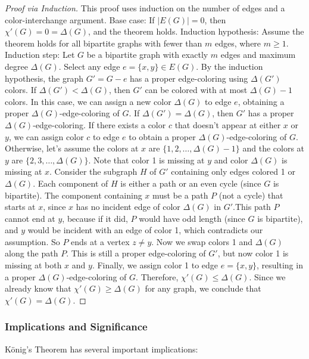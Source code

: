 \documentclass{article}
\theoremstyle{definition}
\begin{document}
\begin{proof}[Proof via Induction]
This proof uses induction on the number of edges and a color-interchange argument. Base case: If $|E(G)| = 0$, then $\chi'(G) = 0 = \Delta(G)$, and the theorem holds. Induction hypothesis: Assume the theorem holds for all bipartite graphs with fewer than $m$ edges, where $m \geq 1$. Induction step: Let $G$ be a bipartite graph with exactly $m$ edges and maximum degree $\Delta(G)$. Select any edge $e = \{x, y\} \in E(G)$. By the induction hypothesis, the graph $G' = G - e$ has a proper edge-coloring using $\Delta(G')$ colors. If $\Delta(G') < \Delta(G)$, then $G'$ can be colored with at most $\Delta(G) - 1$ colors. In this case, we can assign a new color $\Delta(G)$ to edge $e$, obtaining a proper $\Delta(G)$-edge-coloring of $G$. If $\Delta(G') = \Delta(G)$, then $G'$ has a proper $\Delta(G)$-edge-coloring. If there exists a color $c$ that doesn't appear at either $x$ or $y$, we can assign color $c$ to edge $e$ to obtain a proper $\Delta(G)$-edge-coloring of $G$. Otherwise, let's assume the colors at $x$ are $\{1, 2, \ldots, \Delta(G)-1\}$ and the colors at $y$ are $\{2, 3, \ldots, \Delta(G)\}$. Note that color 1 is missing at $y$ and color $\Delta(G)$ is missing at $x$. Consider the subgraph $H$ of $G'$ containing only edges colored 1 or $\Delta(G)$. Each component of $H$ is either a path or an even cycle (since $G$ is bipartite). The component containing $x$ must be a path $P$ (not a cycle) that starts at $x$, since $x$ has no incident edge of color $\Delta(G)$ in $G'$.This path $P$ cannot end at $y$, because if it did, $P$ would have odd length (since $G$ is bipartite), and $y$ would be incident with an edge of color 1, which contradicts our assumption. So $P$ ends at a vertex $z \neq y$. Now we swap colors 1 and $\Delta(G)$ along the path $P$. This is still a proper edge-coloring of $G'$, but now color 1 is missing at both $x$ and $y$. Finally, we assign color 1 to edge $e = \{x, y\}$, resulting in a proper $\Delta(G)$-edge-coloring of $G$. Therefore, $\chi'(G) \leq \Delta(G)$. Since we already know that $\chi'(G) \geq \Delta(G)$ for any graph, we conclude that $\chi'(G) = \Delta(G)$.
\end{proof}

\subsubsection{Implications and Significance}

König's Theorem has several important implications:
\end{document}
